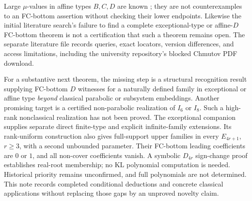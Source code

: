 \documentclass[11pt]{article}
\theoremstyle{definition}\newtheorem{definition}[theorem]{Definition}
\theoremstyle{remark}\newtheorem{remark}[theorem]{Remark}
\begin{document}
Large $\mu$-values in affine types $B,C,D$ are known
\cite{chen}; they are not counterexamples to an FC-bottom assertion
without checking their lower endpoints. Likewise the initial literature
search's failure to find a complete exceptional-type or affine-$D$
FC-bottom theorem is not a certification that such a theorem remains
open. The separate literature file records queries, exact locators,
version differences, and access limitations, including the university
repository's blocked Chmutov PDF download.

For a substantive next theorem, the missing step is a structural
recognition result supplying FC-bottom $D$ witnesses for a naturally
defined family in exceptional or affine type \emph{beyond} classical
parabolic or subsystem embeddings. Another promising target is a
certified non-parabolic realization of $I_6$ or $I_8$.
Such a high-rank nonclassical realization has not been proved. The exceptional
companion supplies separate direct finite-type and explicit infinite-family
extensions. Its rank-uniform construction also gives full-support upper
families in every $E_{4r+1}$, $r\geq3$, with a second unbounded parameter.
Their FC-bottom leading coefficients are $0$ or $1$, and all non-cover
coefficients vanish. A symbolic $D_{4r}$ sign-change proof establishes
real-root membership; no KL polynomial computation is needed. Historical
priority remains unconfirmed, and full polynomials are not determined.
This note records completed conditional deductions
and concrete classical applications without replacing those gaps by
an unproved novelty claim.
\end{document}
